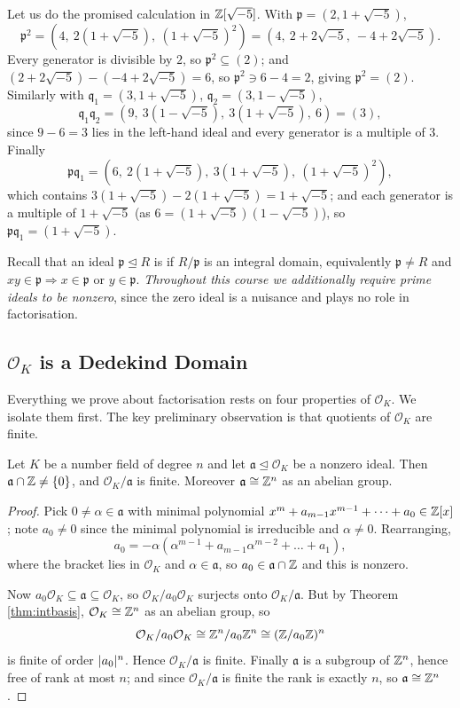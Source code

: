 \documentclass[a4paper]{scrartcl}
\renewcommand{\OO}{\mathcal{O}}
\newcommand{\fa}{\mathfrak{a}}
\newcommand{\fp}{\mathfrak{p}}
\newcommand{\fq}{\mathfrak{q}}
\begin{document}
\begin{example}\label{ex:pcalc}
	Let us do the promised calculation in $\mathbb{Z}[\sqrt{-5}]$. With $\fp = (2, 1+\sqrt{-5})$,
	$$\fp^2 = \left(4,\ 2(1+\sqrt{-5}),\ (1+\sqrt{-5})^2\right) = \left(4,\ 2+2\sqrt{-5},\ -4+2\sqrt{-5}\right).$$
	Every generator is divisible by $2$, so $\fp^2 \subseteq (2)$; and $(2+2\sqrt{-5}) - (-4+2\sqrt{-5}) = 6$, so $\fp^2 \ni 6 - 4 = 2$, giving $\fp^2 = (2)$. Similarly with $\fq_1 = (3,1+\sqrt{-5})$, $\fq_2 = (3,1-\sqrt{-5})$,
	$$\fq_1\fq_2 = \left(9,\ 3(1-\sqrt{-5}),\ 3(1+\sqrt{-5}),\ 6\right) = (3),$$
	since $9 - 6 = 3$ lies in the left-hand ideal and every generator is a multiple of $3$. Finally
	$$\fp\fq_1 = \left(6,\ 2(1+\sqrt{-5}),\ 3(1+\sqrt{-5}),\ (1+\sqrt{-5})^2\right),$$
	which contains $3(1+\sqrt{-5}) - 2(1+\sqrt{-5}) = 1+\sqrt{-5}$;
	and each generator is a multiple of $1+\sqrt{-5}$ (as $6 = (1+\sqrt{-5})(1-\sqrt{-5})$), so $\fp\fq_1 = (1+\sqrt{-5})$.
\end{example}

Recall that an ideal $\fp \trianglelefteq R$ is  if $R/\fp$ is an integral domain, equivalently $\fp \neq R$ and $xy \in \fp \Rightarrow x \in \fp$ or $y \in \fp$. \emph{Throughout this course we additionally require prime ideals to be nonzero}, since the zero ideal is a nuisance and plays no role in factorisation.

\subsection{$\OO_K$ is a Dedekind Domain}

Everything we prove about factorisation rests on four properties of $\OO_K$. We isolate them first. The key preliminary observation is that quotients of $\OO_K$ are finite.

\begin{lemma}\label{lem:finitequot}
	Let $K$ be a number field of degree $n$ and let $\fa \trianglelefteq \OO_K$ be a nonzero ideal. Then $\fa \cap \Z \neq \{0\}$, and $\OO_K/\fa$ is finite. Moreover $\fa \cong \Z^n$ as an abelian group.
\end{lemma}

\begin{proof}
	Pick $0 \neq \alpha \in \fa$ with minimal polynomial $x^m + a_{m-1}x^{m-1}+\dots+a_0 \in \mathbb{Z}[x]$; note $a_0 \neq 0$ since the minimal polynomial is irreducible and $\alpha \neq 0$. Rearranging,
	$$a_0 = -\alpha\left(\alpha^{m-1} + a_{m-1}\alpha^{m-2} + \dots + a_1\right),$$
	where the bracket lies in $\OO_K$ and $\alpha \in \fa$, so $a_0 \in \fa \cap \Z$ and this is nonzero.

	Now $a_0\OO_K \subseteq \fa \subseteq \OO_K$, so $\OO_K/a_0\OO_K$ surjects onto $\OO_K/\fa$. But by Theorem \ref{thm:intbasis}, $\OO_K \cong \Z^n$ as an abelian group, so
	$$\OO_K/a_0\OO_K \cong \Z^n/a_0\Z^n \cong (\Z/a_0\Z)^n$$
	is finite of order $\lvert a_0\rvert^n$. Hence $\OO_K/\fa$ is finite. Finally $\fa$ is a subgroup of $\mathbb{Z}^n$, hence free of rank at most $n$; and since $\OO_K/\fa$ is finite the rank is exactly $n$, so $\fa \cong \Z^n$.
\end{proof}
\end{document}
